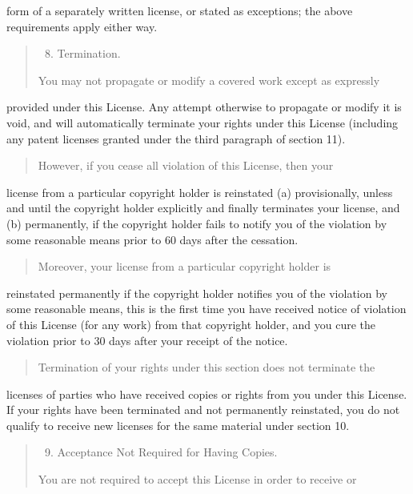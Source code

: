 \documentclass[letterpaper,10pt,english]{sphinxmanual}
\begin{document}
form of a separately written license, or stated as exceptions;
the above requirements apply either way.
\begin{quote}
\begin{enumerate}
\setcounter{enumi}{7}
\item {} 
Termination.

\end{enumerate}

You may not propagate or modify a covered work except as expressly
\end{quote}

provided under this License.  Any attempt otherwise to propagate or
modify it is void, and will automatically terminate your rights under
this License (including any patent licenses granted under the third
paragraph of section 11).
\begin{quote}

However, if you cease all violation of this License, then your
\end{quote}

license from a particular copyright holder is reinstated (a)
provisionally, unless and until the copyright holder explicitly and
finally terminates your license, and (b) permanently, if the copyright
holder fails to notify you of the violation by some reasonable means
prior to 60 days after the cessation.
\begin{quote}

Moreover, your license from a particular copyright holder is
\end{quote}

reinstated permanently if the copyright holder notifies you of the
violation by some reasonable means, this is the first time you have
received notice of violation of this License (for any work) from that
copyright holder, and you cure the violation prior to 30 days after
your receipt of the notice.
\begin{quote}

Termination of your rights under this section does not terminate the
\end{quote}

licenses of parties who have received copies or rights from you under
this License.  If your rights have been terminated and not permanently
reinstated, you do not qualify to receive new licenses for the same
material under section 10.
\begin{quote}
\begin{enumerate}
\setcounter{enumi}{8}
\item {} 
Acceptance Not Required for Having Copies.

\end{enumerate}

You are not required to accept this License in order to receive or
\end{quote}
\end{document}
